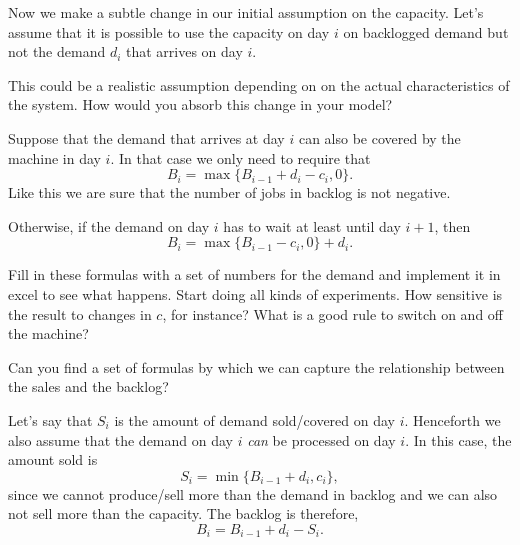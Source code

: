 \begin{question}
  Now we make a subtle change in our initial assumption on the capacity. 
  Let's assume that it is possible to use the capacity on day $i$ on backlogged 
  demand but not the demand $d_i$ that arrives on day $i$. 
  
  
  This could be a realistic assumption depending on
  on the actual characteristics of the system.  How would you absorb this change
  in your model?
\end{question}

  \begin{solution}
    Suppose that the demand that arrives at day $i$ can also be covered by the machine in day $i$. In that case we only need to require that 
    \begin{equation*}
    B_i = \max\{B_{i-1} + d_i - c_i, 0\}.
    \end{equation*}
    Like this we are sure that the number of jobs in backlog is not
    negative.  

Otherwise, if the demand on day $i$ has to wait at least until day $i+1$, then
    \begin{equation*}
    B_i = \max\{B_{i-1} - c_i, 0\} + d_i.
    \end{equation*}

    Fill in these formulas with a set of numbers for the demand and
    implement it in excel to see what happens.  Start doing all kinds
    of experiments. How sensitive is the result to changes in $c$, for
    instance? What is a good rule to switch on and off the machine?
  \end{solution}
 


\begin{question}
  Can you find a set of formulas by which we can capture the relationship between the sales and the backlog? 
\end{question}

  \begin{solution}
    Let's say that $S_i$ is the amount of demand sold/covered on day $i$. Henceforth we also assume that the demand on day $i$ \emph{can} be processed on day $i$. In this case, the amount sold is 
    \begin{equation*}
      S_i = \min\{B_{i-1}+d_i, c_i\},
    \end{equation*}
    since we cannot produce/sell more than the demand in backlog and
    we can also not sell more than the capacity.  The backlog is therefore,
\begin{equation*}
  B_i = B_{i-1}+d_i - S_i.
\end{equation*}
  \end{solution}

